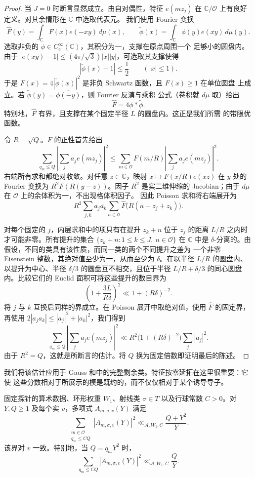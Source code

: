 \begin{proof}
当 $J=0$ 时断言显然成立。由自对偶性，特征 $e(mz_j)$ 在
$\mathbb C/\mathcal O$ 上有良好定义。对其余情形在 $\mathbb C$ 中选取代表元。
我们使用 Fourier 变换
\[
 \widehat F(y)=\int_{\mathbb C}F(x)e(-xy)\,d\mu(x),\qquad
 \check\phi(x)=\int_{\mathbb C}\phi(y)e(xy)\,d\mu(y).
\]
选取非负的 $\phi\in C_c^\infty(\mathbb C)$，其积分为一，支撑在原点周围一个
足够小的圆盘内。由于 $|e(xy)-1|\le (4\pi/\sqrt3)|x||y|$，可选取其支撑使得
\[
 |\check\phi(x)-1|\le\frac12\qquad(|x|\le1).
\]
于是 $F(x)=4|\check\phi(x)|^2$ 是非负 Schwartz 函数，且 $F(x)\ge1$ 在单位圆盘
上成立。若 $\widetilde\phi(y)=\overline{\phi(-y)}$，则 Fourier 反演与乘积
公式（卷积就 $d\mu$ 取）给出
\[
 \widehat F=4\phi*\widetilde\phi.
\]
特别地，$\widehat F$ 有界，且支撑在某个固定半径 $L$ 的圆盘内。这正是我们所需
的带限优函数。

令 $R=\sqrt Q$。$F$ 的正性首先给出
\[
 \sum_{q_m\le Q}\left|\sum_j a_je(mz_j)\right|^2
 \le \sum_{m\in\mathcal O}F(m/R)
                    \left|\sum_j a_je(mz_j)\right|^2.
\]
右端所有求和都绝对收敛。对任意 $z\in\mathbb C$，映射 $x\mapsto F(x/R)e(xz)$
在 $y$ 处的 Fourier 变换为 $R^2\widehat F(R(y-z))$。因子 $R^2$ 是实二维伸缩的
Jacobian；由于 $d\mu$ 在 $\mathcal O$ 上的余体积为一，不出现格体积因子。
因此 Poisson 求和将右端展开为
\[
 R^2\sum_{j,k}a_j\overline{a_k}
       \sum_{n\in\mathcal O}
       \widehat F\bigl(R(n-z_j+z_k)\bigr).
\]

对每个固定的 $j$，内层求和中的项只有在提升 $z_k+n$ 位于 $z_j$ 的距离 $L/R$
之内时才可能非零。所有提升的集合
$\{z_k+n:1\le k\le J,\ n\in\mathcal O\}$ 在 $\mathbb C$ 中是
$\delta$-分离的。由假设，不同的类具有该性质，而同一类的两个不同提升之差为
一个非零 Eisenstein 整数，其绝对值至少为一，从而至少为 $\delta$。在以半径
$L/R$ 的圆盘内、以提升为中心、半径 $\delta/3$ 的圆盘互不相交，且位于半径
$L/R+\delta/3$ 的同心圆盘内。比较它们的 Euclid 面积可将这些提升的数目界为
\[
 \left(1+\frac{3L}{R\delta}\right)^2
 \ll 1+(R\delta)^{-2}.
\]
将 $j$ 与 $k$ 互换后同样的界成立。在 Poisson 展开中取绝对值，使用
$\widehat F$ 的固定界，再使用 $2|a_ja_k|\le |a_j|^2+|a_k|^2$，我们得到
\[
 \sum_{q_m\le Q}\left|\sum_j a_je(mz_j)\right|^2
 \ll R^2\bigl(1+(R\delta)^{-2}\bigr)\sum_j|a_j|^2.
\]
由于 $R^2=Q$，这就是所断言的估计。将 $Q$ 换为固定倍数即证明最后的陈述。
\end{proof}

我们将该估计应用于 Gauss 和中的完整剩余类。特征按零延拓在这里很重要：它使
这些分数相对于所展示的模是既约的，而不仅仅相对于某个诱导导子。

\begin{lemma}[平衡加性范数]
\label{lem:balanced-additive-norm}
固定探针的算术数据、环形权重 $W_1$、射线类 $\sigma\in T$ 以及行球常数
$C>0$。对 $Y,Q\ge1$ 及每个实 $v$，多项式 $A_{m,\sigma,v}(Y)$ 满足
\[
 \sum_{\substack{m\in\mathcal O\\q_m\le CQ}}
       |A_{m,\sigma,v}(Y)|^2
 \ll_{\mathcal A,W_1,C}\frac{Q+Y^2}{Y}.
\]
该界对 $v$ 一致。特别地，当 $Q=q_{b_*}Y^2$ 时，
\[
 \sum_{q_m\le CQ}|A_{m,\sigma,v}(Y)|^2
 \ll_{\mathcal A,W_1,C}\frac QY.
\]
\end{lemma}

